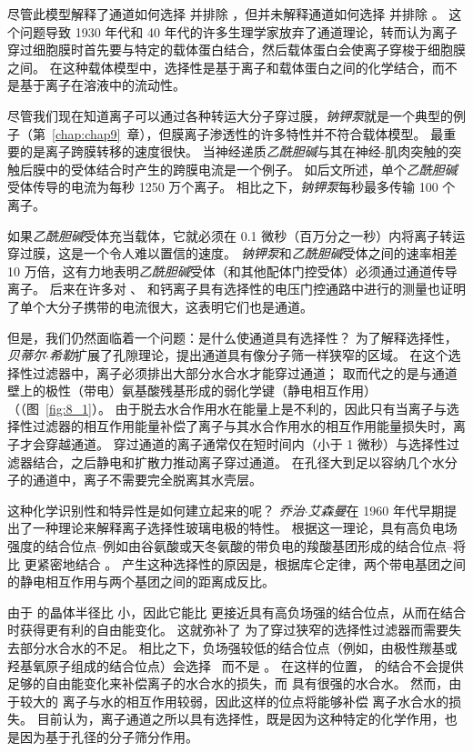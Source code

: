 尽管此模型解释了通道如何选择  并排除 ，但并未解释通道如何选择  并排除 。
这个问题导致 1930 年代和 40 年代的许多生理学家放弃了通道理论，转而认为离子穿过细胞膜时首先要与特定的载体蛋白结合，然后载体蛋白会使离子穿梭于细胞膜之间。
在这种载体模型中，选择性是基于离子和载体蛋白之间的化学结合，而不是基于离子在溶液中的流动性。


尽管我们现在知道离子可以通过各种转运大分子穿过膜，\textit{钠钾泵}就是一个典型的例子（第~\ref{chap:chap9}~章），但膜离子渗透性的许多特性并不符合载体模型。
最重要的是离子跨膜转移的速度很快。 
当神经递质\textit{乙酰胆碱}与其在神经-肌肉突触的突触后膜中的受体结合时产生的跨膜电流是一个例子。
如后文所述，单个\textit{乙酰胆碱}受体传导的电流为每秒 1250 万个离子。
相比之下，\textit{钠钾泵}每秒最多传输 100 个离子。


如果\textit{乙酰胆碱}受体充当载体，它就必须在 0.1 微秒（百万分之一秒）内将离子转运穿过膜，这是一个令人难以置信的速度。
\textit{钠钾泵}和\textit{乙酰胆碱}受体之间的速率相差 10 万倍，这有力地表明\textit{乙酰胆碱}受体（和其他配体门控受体）必须通过通道传导离子。
后来在许多对 、 和钙离子具有选择性的电压门控通路中进行的测量也证明了单个大分子携带的电流很大，这表明它们也是通道。


但是，我们仍然面临着一个问题：是什么使通道具有选择性？
为了解释选择性，\textit{贝蒂尔$\cdot$希勒}扩展了孔隙理论，提出通道具有像分子筛一样狭窄的区域。
在这个选择性过滤器中，离子必须排出大部分水合水才能穿过通道；
取而代之的是与通道壁上的极性（带电）氨基酸残基形成的弱化学键（静电相互作用）（（图~\ref{fig:8_1}）。
由于脱去水合作用水在能量上是不利的，因此只有当离子与选择性过滤器的相互作用能量补偿了离子与其水合作用水的相互作用能量损失时，离子才会穿越通道。
穿过通道的离子通常仅在短时间内（小于 1 微秒）与选择性过滤器结合，之后静电和扩散力推动离子穿过通道。
在孔径大到足以容纳几个水分子的通道中，离子不需要完全脱离其水壳层。


这种化学识别性和特异性是如何建立起来的呢？
\textit{乔治$\cdot$艾森曼}在 1960 年代早期提出了一种理论来解释离子选择性玻璃电极的特性。
根据这一理论，具有高负电场强度的结合位点--例如由谷氨酸或天冬氨酸的带负电的羧酸基团形成的结合位点--将比  更紧密地结合 。
产生这种选择性的原因是，根据库仑定律，两个带电基团之间的静电相互作用与两个基团之间的距离成反比。


由于  的晶体半径比  小，因此它能比  更接近具有高负场强的结合位点，从而在结合时获得更有利的自由能变化。
这就弥补了  为了穿过狭窄的选择性过滤器而需要失去部分水合水的不足。
相比之下，负场强较低的结合位点（例如，由极性羰基或羟基氧原子组成的结合位点）会选择~ 而不是 。
在这样的位置， 的结合不会提供足够的自由能变化来补偿离子的水合水的损失，而  具有很强的水合水。
然而，由于较大的  离子与水的相互作用较弱，因此这样的位点将能够补偿  离子水合水的损失。
目前认为，离子通道之所以具有选择性，既是因为这种特定的化学作用，也是因为基于孔径的分子筛分作用。



